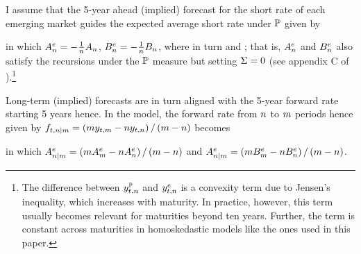 {I assume that the 5-year ahead (implied) forecast for the short rate of each emerging market guides %
the expected average short rate under \(\mathbb{P}\) given by

\noindent in which \(A_{n}^{e} = - \frac{1}{n} A_{n}\), \(B_{n}^{e} = - \frac{1}{n} B_{n}\), where in turn \!and \!\!; that is, \(A_{n}^{e}\) and \(B_{n}^{e}\) also satisfy the recursions under the \(\mathbb{P}\) measure but setting \(\Sigma = 0\) (see appendix C of \cite{Guimaraes:2014}).\footnote{ The difference between \(y_{t,n}^{\mathbb{P}}\) and \(y_{t,n}^{e}\) is a convexity term due to Jensen's inequality, which increases with maturity. In practice, however, this term usually becomes relevant for maturities beyond ten years. Further, the term is constant across maturities in homoskedastic models like the ones used in this paper.}

Long-term (implied) forecasts 
are in turn aligned with the 5-year forward rate starting 5 years hence.
In the model, the forward rate from \(n\) to \(m\) periods hence
given by \(f_{t,n | m} = \left( m y_{t,m} - n y_{t,n} \right)/ \left( m - n \right)\) becomes

\noindent in which \(A_{n | m}^{e} = \left( m A_{m}^{e} - n A_{n}^{e} \right)/ \left( m - n \right)\)  and \(A_{n | m}^{e} = \left( m B_{m}^{e} - n B_{n}^{e} \right)/ \left( m - n \right)\).


%	
%	
%	


}
